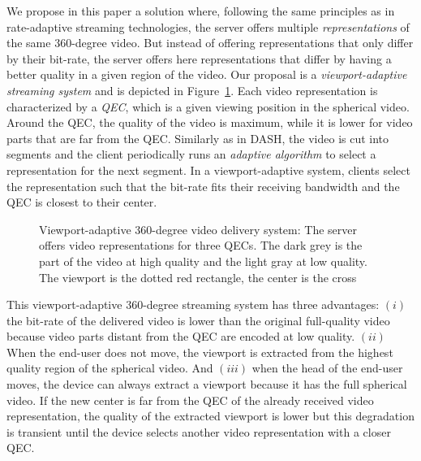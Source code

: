 We propose in this paper a solution where, following the same
principles as in rate-adaptive streaming technologies, the server
offers multiple \emph{representations} of the same $360$-degree video.
But instead of offering representations that only differ by their
bit-rate, the server offers here representations that differ by having
a better quality in a given region of the video. Our proposal is a
\emph{viewport-adaptive streaming system} and is depicted in
Figure~\ref{fig:deliverychain}. Each video representation is characterized
by a \emph{\ac{QEC}}, which is a given viewing position in the
spherical video. Around the \ac{QEC}, the quality of the video is
maximum, while it is lower for video parts that are far from the
\ac{QEC}. Similarly as in \ac{DASH}, the video is cut into segments
and the client periodically runs an \emph{adaptive algorithm} to
select a representation for the next segment. In a
viewport-adaptive system, clients select the representation
such that the bit-rate fits their receiving
bandwidth and the \ac{QEC} is closest to their \FoV{} center.

\begin{figure}
   \centering
   
   \caption{Viewport-adaptive 360-degree video delivery system: The server
   offers video representations for three \acp{QEC}. The dark grey is the part of the video at high quality and the light
   gray at low quality. The viewport is the dotted red rectangle, the \FoV{} center is the cross}
   \label{fig:deliverychain}
\end{figure}

This viewport-adaptive $360$-degree streaming system has three
advantages: $(i)$ the bit-rate of the delivered video is lower than
the original full-quality video because video parts distant from the
\ac{QEC} are encoded at low quality. $(ii)$ When the end-user does not
move, the viewport is extracted from the highest quality region of the
spherical video. And $(iii)$ when the head of the end-user moves, the
device can always extract a viewport because it has the full
spherical video. If the new \FoV{} center is far from the \ac{QEC}
of the already received video representation, the quality of the
extracted viewport is lower but this degradation is transient until the
device selects another video representation with a closer \ac{QEC}.

